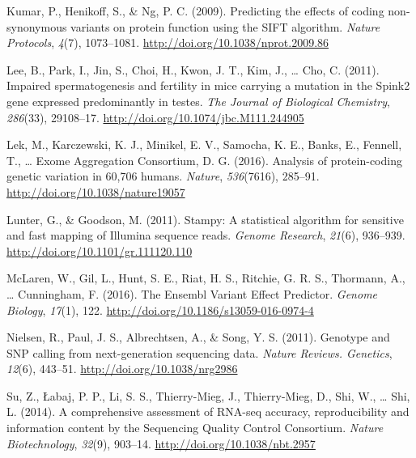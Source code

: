\documentclass[12pt,twoside]{reedthesis}
\theoremstyle{definition}
\theoremstyle{definition}
\theoremstyle{remark}
\begin{document}
  \hypertarget{ref-Kumar2009}{}
  Kumar, P., Henikoff, S., \& Ng, P. C. (2009). Predicting the effects of
  coding non-synonymous variants on protein function using the SIFT
  algorithm. \emph{Nature Protocols}, \emph{4}(7), 1073--1081.
  \url{http://doi.org/10.1038/nprot.2009.86}
  
  \hypertarget{ref-Lee2011}{}
  Lee, B., Park, I., Jin, S., Choi, H., Kwon, J. T., Kim, J., \ldots{}
  Cho, C. (2011). Impaired spermatogenesis and fertility in mice carrying
  a mutation in the Spink2 gene expressed predominantly in testes.
  \emph{The Journal of Biological Chemistry}, \emph{286}(33), 29108--17.
  \url{http://doi.org/10.1074/jbc.M111.244905}
  
  \hypertarget{ref-Lek2016}{}
  Lek, M., Karczewski, K. J., Minikel, E. V., Samocha, K. E., Banks, E.,
  Fennell, T., \ldots{} Exome Aggregation Consortium, D. G. (2016).
  Analysis of protein-coding genetic variation in 60,706 humans.
  \emph{Nature}, \emph{536}(7616), 285--91.
  \url{http://doi.org/10.1038/nature19057}
  
  \hypertarget{ref-Lunter2011}{}
  Lunter, G., \& Goodson, M. (2011). Stampy: A statistical algorithm for
  sensitive and fast mapping of Illumina sequence reads. \emph{Genome
  Research}, \emph{21}(6), 936--939.
  \url{http://doi.org/10.1101/gr.111120.110}
  
  \hypertarget{ref-McLaren2016}{}
  McLaren, W., Gil, L., Hunt, S. E., Riat, H. S., Ritchie, G. R. S.,
  Thormann, A., \ldots{} Cunningham, F. (2016). The Ensembl Variant Effect
  Predictor. \emph{Genome Biology}, \emph{17}(1), 122.
  \url{http://doi.org/10.1186/s13059-016-0974-4}
  
  \hypertarget{ref-Nielsen2011}{}
  Nielsen, R., Paul, J. S., Albrechtsen, A., \& Song, Y. S. (2011).
  Genotype and SNP calling from next-generation sequencing data.
  \emph{Nature Reviews. Genetics}, \emph{12}(6), 443--51.
  \url{http://doi.org/10.1038/nrg2986}
  
  \hypertarget{ref-Su2014}{}
  Su, Z., Łabaj, P. P., Li, S. S., Thierry-Mieg, J., Thierry-Mieg, D.,
  Shi, W., \ldots{} Shi, L. (2014). A comprehensive assessment of RNA-seq
  accuracy, reproducibility and information content by the Sequencing
  Quality Control Consortium. \emph{Nature Biotechnology}, \emph{32}(9),
  903--14. \url{http://doi.org/10.1038/nbt.2957}


\end{document}
